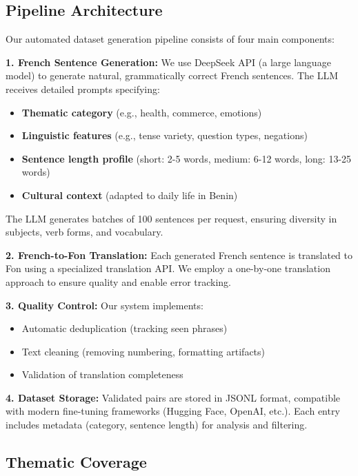 \documentclass[10pt,twocolumn]{article}
\begin{document}
\subsection{Pipeline Architecture}

Our automated dataset generation pipeline consists of four main components:

\textbf{1. French Sentence Generation:} We use DeepSeek API (a large language model) to generate natural, grammatically correct French sentences. The LLM receives detailed prompts specifying:
\begin{itemize}[leftmargin=*,noitemsep,topsep=0pt]
    \item \textbf{Thematic category} (e.g., health, commerce, emotions)
    \item \textbf{Linguistic features} (e.g., tense variety, question types, negations)
    \item \textbf{Sentence length profile} (short: 2-5 words, medium: 6-12 words, long: 13-25 words)
    \item \textbf{Cultural context} (adapted to daily life in Benin)
\end{itemize}

The LLM generates batches of 100 sentences per request, ensuring diversity in subjects, verb forms, and vocabulary.

\textbf{2. French-to-Fon Translation:} Each generated French sentence is translated to Fon using a specialized translation API. We employ a one-by-one translation approach to ensure quality and enable error tracking.

\textbf{3. Quality Control:} Our system implements:
\begin{itemize}[leftmargin=*,noitemsep,topsep=0pt]
    \item Automatic deduplication (tracking seen phrases)
    \item Text cleaning (removing numbering, formatting artifacts)
    \item Validation of translation completeness
\end{itemize}

\textbf{4. Dataset Storage:} Validated pairs are stored in JSONL format, compatible with modern fine-tuning frameworks (Hugging Face, OpenAI, etc.). Each entry includes metadata (category, sentence length) for analysis and filtering.

\subsection{Thematic Coverage}
\end{document}
